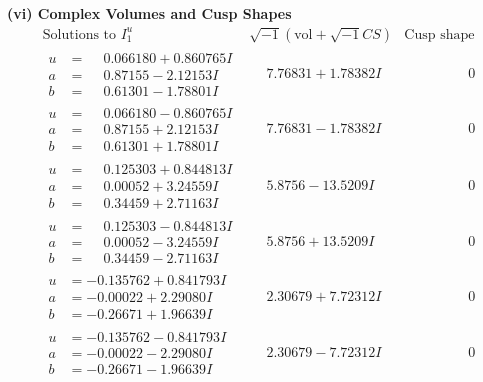 \documentclass[1p]{elsarticle_modified}
\theoremstyle{definition}
\newcommand{\I}{\sqrt{-1}}
\begin{document}
\newpage\flushleft \textbf{(vi) Complex Volumes and Cusp Shapes}
$$\begin{array}{c|c|c}  
\text{Solutions to }I^u_{1}& \I (\text{vol} + \sqrt{-1}CS) & \text{Cusp shape}\\
 \hline 
\begin{aligned}
u &= \phantom{-}0.066180 + 0.860765 I \\
a &= \phantom{-}0.87155 - 2.12153 I \\
b &= \phantom{-}0.61301 - 1.78801 I\end{aligned}
 & \phantom{-}7.76831 + 1.78382 I & \phantom{-0.000000 } 0 \\ \hline\begin{aligned}
u &= \phantom{-}0.066180 - 0.860765 I \\
a &= \phantom{-}0.87155 + 2.12153 I \\
b &= \phantom{-}0.61301 + 1.78801 I\end{aligned}
 & \phantom{-}7.76831 - 1.78382 I & \phantom{-0.000000 } 0 \\ \hline\begin{aligned}
u &= \phantom{-}0.125303 + 0.844813 I \\
a &= \phantom{-}0.00052 + 3.24559 I \\
b &= \phantom{-}0.34459 + 2.71163 I\end{aligned}
 & \phantom{-}5.8756 - 13.5209 I & \phantom{-0.000000 } 0 \\ \hline\begin{aligned}
u &= \phantom{-}0.125303 - 0.844813 I \\
a &= \phantom{-}0.00052 - 3.24559 I \\
b &= \phantom{-}0.34459 - 2.71163 I\end{aligned}
 & \phantom{-}5.8756 + 13.5209 I & \phantom{-0.000000 } 0 \\ \hline\begin{aligned}
u &= -0.135762 + 0.841793 I \\
a &= -0.00022 + 2.29080 I \\
b &= -0.26671 + 1.96639 I\end{aligned}
 & \phantom{-}2.30679 + 7.72312 I & \phantom{-0.000000 } 0 \\ \hline\begin{aligned}
u &= -0.135762 - 0.841793 I \\
a &= -0.00022 - 2.29080 I \\
b &= -0.26671 - 1.96639 I\end{aligned}
 & \phantom{-}2.30679 - 7.72312 I & \phantom{-0.000000 } 0 \\ \hline\begin{aligned}

\end{aligned}
\end{array}$$
\end{document}
